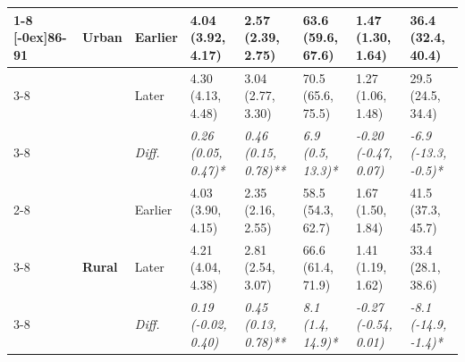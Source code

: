 \documentclass[12pt, a4paper]{article}
\begin{document}
\begin{appendices}
\begin{table}[!p]
{\begin{tabular}[t]{>{}l>{}lllllll}
        \cmidrule{1-8}
        \multirow{9}{*}[-0ex]{\textbf{86-91}} & \multirow{3}{*}{\textbf{Urban}} & Earlier                       & 4.04 (3.92, 4.17)                           & 2.57 (2.39, 2.75)                            & 63.6 (59.6, 67.6)                           & 1.47 (1.30, 1.64)                               & 36.4 (32.4, 40.4)                              \\
        \cmidrule{3-8}
                                              &                                 & Later                         & 4.30 (4.13, 4.48)                           & 3.04 (2.77, 3.30)                            & 70.5 (65.6, 75.5)                           & 1.27 (1.06, 1.48)                               & 29.5 (24.5, 34.4)                              \\
        \cmidrule{3-8}
                                              &                                 & \cellcolor{gray!10}\em{Diff.} & \cellcolor{gray!10}\em{0.26 (0.05, 0.47)*}  & \cellcolor{gray!10}\em{0.46 (0.15, 0.78)**}  & \cellcolor{gray!10}\em{6.9 (0.5, 13.3)*}    & \cellcolor{gray!10}\em{-0.20 (-0.47, 0.07)}     & \cellcolor{gray!10}\em{-6.9 (-13.3, -0.5)*}    \\
        \cmidrule{2-8}
                                              & \multirow{3}{*}{\textbf{Rural}} & Earlier                       & 4.03 (3.90, 4.15)                           & 2.35 (2.16, 2.55)                            & 58.5 (54.3, 62.7)                           & 1.67 (1.50, 1.84)                               & 41.5 (37.3, 45.7)                              \\
        \cmidrule{3-8}
                                              &                                 & Later                         & 4.21 (4.04, 4.38)                           & 2.81 (2.54, 3.07)                            & 66.6 (61.4, 71.9)                           & 1.41 (1.19, 1.62)                               & 33.4 (28.1, 38.6)                              \\
        \cmidrule{3-8}
                                              &                                 & \cellcolor{gray!10}\em{Diff.} & \cellcolor{gray!10}\em{0.19 (-0.02, 0.40)}  & \cellcolor{gray!10}\em{0.45 (0.13, 0.78)**}  & \cellcolor{gray!10}\em{8.1 (1.4, 14.9)*}    & \cellcolor{gray!10}\em{-0.27 (-0.54, 0.01)}     & \cellcolor{gray!10}\em{-8.1 (-14.9, -1.4)*}    \\
        \bottomrule
      \end{tabular}}
  \end{table}
  \vspace*{\fill}

\end{appendices}
\end{document}

